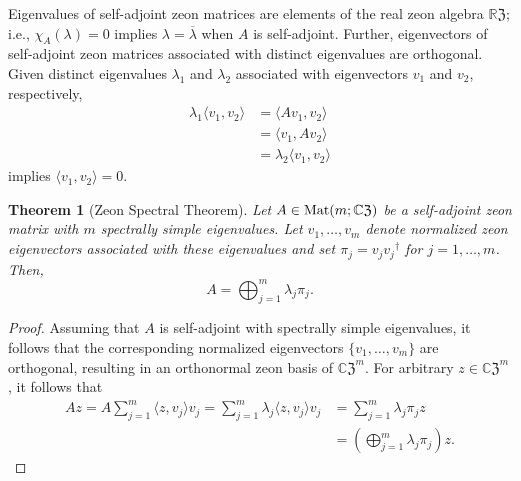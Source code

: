 \documentclass{article}
\newtheorem{theorem}{Theorem}[section]
\theoremstyle{definition}
\newcommand{\CZ}{\mathbb{C}\mathfrak{Z}}
\newcommand{\Mat}{{\rm Mat}}
\newcommand{\RZ}{\mathbb{R}\mathfrak{Z}}
\numberwithin{equation}{section}
\begin{document}
Eigenvalues of self-adjoint zeon matrices are elements of the real zeon algebra $\RZ$; i.e., $\chi_A(\lambda)=0$ implies $\lambda=\overline{\lambda}$ when $A$ is self-adjoint.   Further, eigenvectors of self-adjoint zeon matrices associated with distinct eigenvalues are orthogonal.  Given distinct eigenvalues $\lambda_1$ and $\lambda_2$ associated with eigenvectors $v_1$ and $v_2$, respectively, 
\begin{align*}
\lambda_1\langle v_1, v_2\rangle&=\langle Av_1, v_2\rangle\\
&=\langle v_1, A v_2\rangle\\
&=\lambda_2 \langle v_1, v_2\rangle
\end{align*}
implies $\langle v_1, v_2\rangle=0$.


\begin{theorem}[Zeon Spectral Theorem]\label{strong spectral theorem}
Let $A\in\Mat(m;\CZ)$ be a self-adjoint zeon matrix with $m$ spectrally simple eigenvalues.  Let $v_1, \ldots, v_m$ denote normalized zeon eigenvectors associated with these eigenvalues and set $\pi_j=v_j{v_j}^\dag$ for $j=1, \ldots, m$.  Then, \begin{equation*}
A=\bigoplus_{j=1}^m \lambda_j\pi_j.
\end{equation*}
\end{theorem}

\begin{proof}
Assuming that $A$ is self-adjoint with spectrally simple eigenvalues, it follows that the corresponding normalized eigenvectors $\{v_1, \ldots, v_m\}$ are orthogonal, resulting in an orthonormal zeon basis of ${\CZ}^m$.  For arbitrary $z\in {\CZ}^m$, it follows that \begin{align*}
Az=A\sum_{j=1}^m \langle z,v_j\rangle v_j=\sum_{j=1}^m \lambda_j \langle z,v_j\rangle v_j&=\sum_{j=1}^m \lambda_j \pi_j z\\
&=\left(\bigoplus_{j=1}^m \lambda_j \pi_j\right)z.
\end{align*}
\end{proof}
\end{document}
